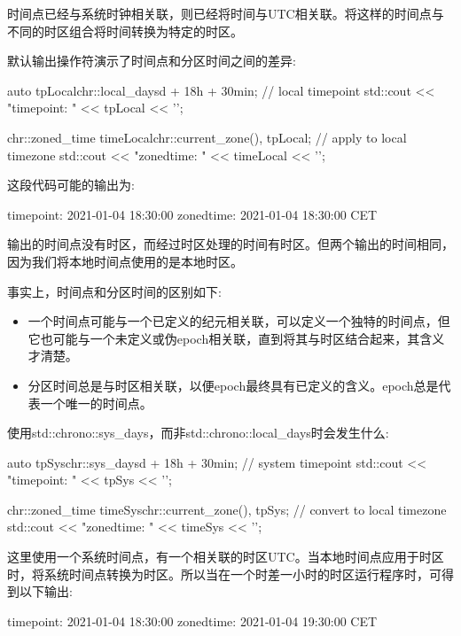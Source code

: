 时间点已经与系统时钟相关联，则已经将时间与UTC相关联。将这样的时间点与不同的时区组合将时间转换为特定的时区。

默认输出操作符演示了时间点和分区时间之间的差异:

\begin{cpp}
auto tpLocal{chr::local_days{d} + 18h + 30min}; // local timepoint
std::cout << "timepoint: " << tpLocal << '\n';

chr::zoned_time timeLocal{chr::current_zone(), tpLocal}; // apply to local timezone
std::cout << "zonedtime: " << timeLocal << '\n';
\end{cpp}

这段代码可能的输出为:

\begin{shell}
timepoint: 2021-01-04 18:30:00
zonedtime: 2021-01-04 18:30:00 CET
\end{shell}

输出的时间点没有时区，而经过时区处理的时间有时区。但两个输出的时间相同，因为我们将本地时间点使用的是本地时区。

事实上，时间点和分区时间的区别如下:

\begin{itemize}
\item
一个时间点可能与一个已定义的纪元相关联，可以定义一个独特的时间点，但它也可能与一个未定义或伪epoch相关联，直到将其与时区结合起来，其含义才清楚。

\item
分区时间总是与时区相关联，以便epoch最终具有已定义的含义。epoch总是代表一个唯一的时间点。
\end{itemize}

使用std::chrono::sys\_days，而非std::chrono::local\_days时会发生什么:

\begin{cpp}
auto tpSys{chr::sys_days{d} + 18h + 30min}; // system timepoint
std::cout << "timepoint: " << tpSys << '\n';

chr::zoned_time timeSys{chr::current_zone(), tpSys}; // convert to local timezone
std::cout << "zonedtime: " << timeSys << '\n';
\end{cpp}

这里使用一个系统时间点，有一个相关联的时区UTC。当本地时间点应用于时区时，将系统时间点转换为时区。所以当在一个时差一小时的时区运行程序时，可得到以下输出:

\begin{shell}
timepoint: 2021-01-04 18:30:00
zonedtime: 2021-01-04 19:30:00 CET
\end{shell}

